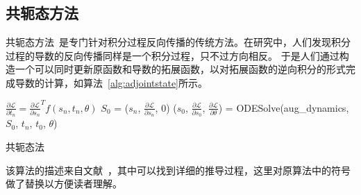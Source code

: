 \documentclass[A4,twoside,fontset=ubuntu,UTF8]{ctexart}
\begin{document}
\subsection{共轭态方法}
    共轭态方法~\cite{Plessix2006,Chen2018}是专门针对积分过程反向传播的传统方法。在研究中，人们发现积分过程的导数的反向传播同样是一个积分过程，只不过方向相反。
    于是人们通过构造一个可以同时更新原函数和导数的拓展函数，以对拓展函数的逆向积分的形式完成导数的计算，如算法~\ref{alg:adjointstate}所示。
\begin{algorithm}
    \SetAlgoLined
    \DontPrintSemicolon
        $\frac{\partial \mathcal{L}}{\partial t_n} = \frac{\partial \mathcal{L}}{\partial s_n}^Tf(s_n,t_n,\theta)$ 
        $S_0$ = ($s_n$, $\frac{\partial \mathcal{L}}{\partial s_n}$, $0$) 
        ($s_0$, $\frac{\partial \mathcal{L}}{\partial s_0}$, $\frac{\partial \mathcal{L}}{\partial \theta}$) = ODESolve(aug\_dynamics, $S_0$, $t_n$, $t_0$, $\theta$) 
    \caption{共轭态法}\label{alg:adjointstate}
\end{algorithm}

该算法的描述来自文献~\cite{Chen2018}，其中可以找到详细的推导过程，这里对原算法中的符号做了替换以方便读者理解。
\end{document}
